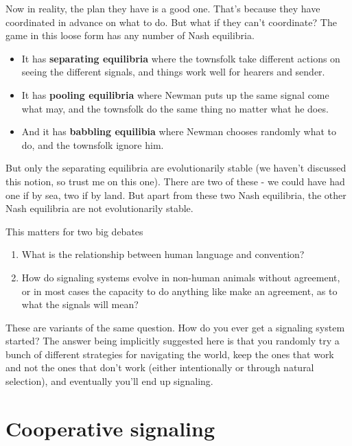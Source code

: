 \documentclass[
  11pt,
]{article}
\providecommand{\tightlist}{%
  \setlength{\itemsep}{0pt}\setlength{\parskip}{0pt}}
\begin{document}
Now in reality, the plan they have is a good one. That's because they
have coordinated in advance on what to do. But what if they can't
coordinate? The game in this loose form has any number of Nash
equilibria.

\begin{itemize}
\tightlist
\item
  It has \textbf{separating equilibria} where the townsfolk take
  different actions on seeing the different signals, and things work
  well for hearers and sender.
\item
  It has \textbf{pooling equilibria} where Newman puts up the same
  signal come what may, and the townsfolk do the same thing no matter
  what he does.
\item
  And it has \textbf{babbling equilibia} where Newman chooses randomly
  what to do, and the townsfolk ignore him.
\end{itemize}

But only the separating equilibria are evolutionarily stable (we haven't
discussed this notion, so trust me on this one). There are two of these
- we could have had one if by sea, two if by land. But apart from these
two Nash equilibria, the other Nash equilibria are not evolutionarily
stable.

This matters for two big debates

\begin{enumerate}
\def\labelenumi{\arabic{enumi}.}
\tightlist
\item
  What is the relationship between human language and convention?
\item
  How do signaling systems evolve in non-human animals without
  agreement, or in most cases the capacity to do anything like make an
  agreement, as to what the signals will mean?
\end{enumerate}

These are variants of the same question. How do you ever get a signaling
system started? The answer being implicitly suggested here is that you
randomly try a bunch of different strategies for navigating the world,
keep the ones that work and not the ones that don't work (either
intentionally or through natural selection), and eventually you'll end
up signaling.

\hypertarget{cooperative-signaling}{%
\section{Cooperative signaling}\label{cooperative-signaling}}
\end{document}
